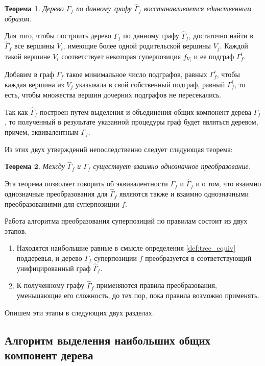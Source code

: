 \documentclass[12pt,a4paper]{article}
\newtheorem{theorem}{Теорема}
\begin{document}
\begin{theorem}
  Дерево $\Gamma_f$ по данному графу $\hat{\Gamma}_f$ восстанавливается единственным образом.
\end{theorem}
\begin{Proof}
  Для того, чтобы построить дерево $\Gamma_f$ по данному графу $\hat{\Gamma}_f$,
  достаточно найти в $\hat{\Gamma}_f$ все вершины $V_i$, имеющие более одной
  родительской вершины $V_j$. Каждой такой вершине $V_i$ соответствует некоторая
  суперпозиция $f_{V_i}$ и ее подграф $\Gamma_f^i$.
  
  Добавим в граф $\Gamma_f$
  такое минимальное число подграфов, равных $\Gamma_f^i$, чтобы каждая вершина
  из $V_j$ указывала в свой собственный подграф, равный $\Gamma_f^i$, то есть,
  чтобы множества вершин дочерних подграфов не пересекались.

  Так как $\hat{\Gamma}_f$ построен путем выделения и объединения общих компонент
  дерева $\Gamma_f$, то полученный в результате указанной процедуры граф будет
  являться деревом, причем, эквивалентным $\Gamma_f$.
\end{Proof}

Из этих двух утверждений непоследственно следует следующая теорема:
\begin{theorem}
  Между $\hat{\Gamma}_f$ и $\Gamma_f$ существует взаимно однозначное преобразование.
\end{theorem}

Эта теорема позволяет говорить об эквивалентности $\Gamma_f$ и $\hat{\Gamma}_f$
и о том, что взаимно однозначные преобразования для $\hat{\Gamma}_f$ являются
также и взаимно однозначными преобразованиями для суперпозиции $f$.

Работа алгоритма преобразования суперпозиций по правилам состоит из двух этапов.
\begin{enumerate}
  \item Находятся наибольшие равные в смысле определения \ref{def:tree_equiv}
	поддеревья, и дерево $\Gamma_f$ суперпозиции $f$ преобразуется в
	соответствующий унифицированный граф $\hat{\Gamma}_f$.
  \item К полученному графу $\hat{\Gamma}_f$ применяются правила преобразования,
	уменьшающие его сложность, до тех пор, пока правила возможно применять.
\end{enumerate}

Опишем эти этапы в следующих двух разделах.

\subsection{Алгоритм выделения наибольших общих компонент дерева}
\end{document}
